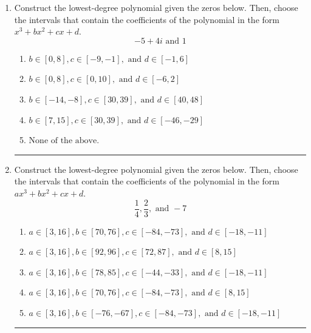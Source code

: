 \documentclass[14pt]{extbook}
\newcommand{\litem}[1]{\item#1\hspace*{-1cm}\rule{\textwidth}{0.4pt}}
\begin{document}
\begin{enumerate}
\litem{
Construct the lowest-degree polynomial given the zeros below. Then, choose the intervals that contain the coefficients of the polynomial in the form $x^3+bx^2+cx+d$.\[ -5 + 4 i \text{ and } 1 \]\begin{enumerate}[label=\Alph*.]
\item \( b \in [0, 8], c \in [-9, -1], \text{ and } d \in [-1, 6] \)
\item \( b \in [0, 8], c \in [0, 10], \text{ and } d \in [-6, 2] \)
\item \( b \in [-14, -8], c \in [30, 39], \text{ and } d \in [40, 48] \)
\item \( b \in [7, 15], c \in [30, 39], \text{ and } d \in [-46, -29] \)
\item \( \text{None of the above.} \)

\end{enumerate} }
\litem{
Construct the lowest-degree polynomial given the zeros below. Then, choose the intervals that contain the coefficients of the polynomial in the form $ax^3+bx^2+cx+d$.\[ \frac{1}{4}, \frac{2}{3}, \text{ and } -7 \]\begin{enumerate}[label=\Alph*.]
\item \( a \in [3, 16], b \in [70, 76], c \in [-84, -73], \text{ and } d \in [-18, -11] \)
\item \( a \in [3, 16], b \in [92, 96], c \in [72, 87], \text{ and } d \in [8, 15] \)
\item \( a \in [3, 16], b \in [78, 85], c \in [-44, -33], \text{ and } d \in [-18, -11] \)
\item \( a \in [3, 16], b \in [70, 76], c \in [-84, -73], \text{ and } d \in [8, 15] \)
\item \( a \in [3, 16], b \in [-76, -67], c \in [-84, -73], \text{ and } d \in [-18, -11] \)


\end{enumerate}}
\end{enumerate}
\end{document}
